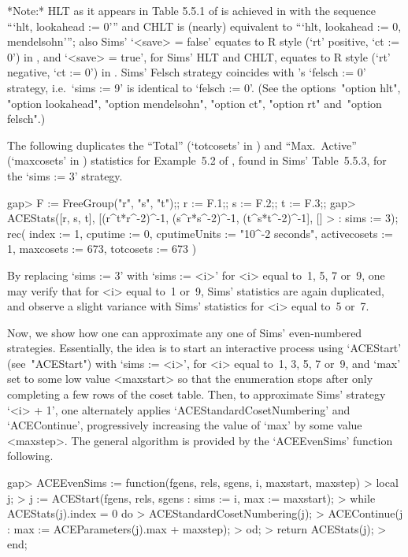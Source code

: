 *Note:* 
HLT as it appears in Table 5.5.1 of \cite{Sim94} is achieved in {\ACE}
with the sequence ```hlt, lookahead  :=  0'''  and  CHLT  is  (nearly)
equivalent to  ```hlt,  lookahead  :=  0,  mendelsohn''';  also  Sims'
`<save> = false' equates to R style (`rt'  positive,  `ct  :=  0')  in
{\ACE}, and `<save> = true', for Sims' HLT and CHLT,  equates  to  R\*
style (`rt' negative, `ct := 0')  in  {\ACE}.  Sims'  Felsch  strategy
coincides with {\ACE}'s `felsch := 0' strategy, i.e.~`sims  :=  9'  is
identical to `felsch := 0'. (See  the  options~"option  hlt",  "option
lookahead", "option mendelsohn", "option ct", "option rt"  and~"option
felsch".)

The following duplicates the ``Total''  (`totcosets'  in  {\ACE})  and
``Max.~Active'' (`maxcosets' in {\ACE}) statistics for Example~5.2  of
\cite{Sim94},  found  in  Sims'  Table~5.5.3,  for  the  `sims  :=  3'
strategy.

\beginexample
gap> F := FreeGroup("r", "s", "t");; r := F.1;; s := F.2;; t := F.3;;
gap> ACEStats([r, s, t], [(r^t*r^-2)^-1, (s^r*s^-2)^-1, (t^s*t^-2)^-1], []
>             : sims := 3);
rec( index := 1, cputime := 0, cputimeUnits := "10^-2 seconds", 
  activecosets := 1, maxcosets := 673, totcosets := 673 )
\endexample

By replacing `sims := 3' with `sims := <i>' for <i> equal to~1,  5,  7
or~9, one may verify that for <i> equal to~1  or~9,  Sims'  statistics
are again  duplicated,  and  observe  a  slight  variance  with  Sims'
statistics for <i> equal to~5 or~7.

Now, we show how one can approximate any one of  Sims'  even-numbered
strategies. Essentially, the idea is to start  an  interactive  {\ACE}
process using `ACEStart' (see~"ACEStart") with `sims := <i>', for  <i>
equal to~1, 3, 5, 7 or~9, and `max' set to some low  value  <maxstart>
so that the enumeration stops after only completing a few rows of  the
coset table. Then, to  approximate  Sims'  strategy  `<i>  +  1',  one
alternately  applies  `ACEStandardCosetNumbering'  and  `ACEContinue',
progressively increasing the value of `max' by some  value  <maxstep>.
The general  algorithm  is  provided  by  the  `ACEEvenSims'  function
following.

\beginexample
gap> ACEEvenSims := function(fgens, rels, sgens, i, maxstart, maxstep) 
>      local j;
>      j := ACEStart(fgens, rels, sgens : sims := i, max := maxstart);
>      while ACEStats(j).index = 0 do
>        ACEStandardCosetNumbering(j);
>        ACEContinue(j : max := ACEParameters(j).max + maxstep);
>      od;
>      return ACEStats(j);
>    end;
\endexample


